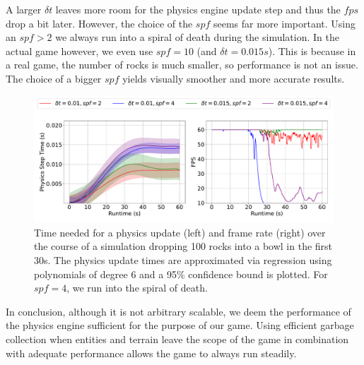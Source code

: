 A larger $\delta t$ leaves more room for the physics engine update step and thus the $fps$ drop a bit later.
However, the choice of the $spf$ seems far more important. 
Using an $spf>2$ we always run into a spiral of death during the simulation.
In the actual game however, we even use $spf=10$ (and $\delta t=0.015s$).
This is because in a real game, the number of rocks is much smaller, so performance is not an issue.
The choice of a bigger $spf$ yields visually smoother and more accurate results.

\begin{figure}[h!]
  \centering
  \includegraphics[width = \linewidth]{figures/physics/perf.pdf}
  \caption{Time needed for a physics update (left) and frame rate (right) over the course of a simulation dropping 100 rocks into a bowl in the first 30s. The physics update times are approximated via regression using polynomials of degree 6 and a 95\% confidence bound is plotted. For $spf=4$, we run into the spiral of death.}
  \label{fig:perf}
\end{figure}

In conclusion, although it is not arbitrary scalable, we deem the performance of the physics engine sufficient for the purpose of our game.
Using efficient garbage collection when entities and terrain leave the scope of the game in combination with adequate performance allows the game to always run steadily.

